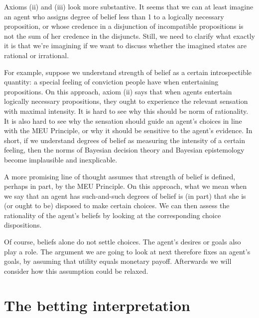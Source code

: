 Axioms (ii) and (iii) look more substantive. It seems that we can at least
imagine an agent who assigns degree of belief less than 1 to a logically
necessary proposition, or whose credence in a disjunction of incompatible
propositions is not the sum of her credence in the disjuncts. Still,
we need to clarify what exactly it is that we're imagining if we want to discuss
whether the imagined states are rational or irrational.

For example, suppose we understand strength of belief as a certain
introspectible quantity: a special feeling of conviction people have when
entertaining propositions. On this approach, axiom (ii) says that when agents
entertain logically necessary propositions, they ought to experience the
relevant sensation with maximal intensity. It is hard to see why this should be
norm of rationality. It is also hard to see why the sensation should guide an
agent's choices in line with the MEU Principle, or why it should be sensitive to
the agent's evidence. In short, if we understand degrees of belief as measuring
the intensity of a certain feeling, then the norms of Bayesian decision theory
and Bayesian epistemology become implausible and inexplicable.


A more promising line of thought assumes that strength of belief is defined,
perhaps in part, by the MEU Principle. On this approach, what we mean when we
say that an agent has such-and-such degrees of belief is (in part) that she is
(or ought to be) disposed to make certain choices. We can then assess the
rationality of the agent's beliefs by looking at the corresponding choice
dispositions.

Of course, beliefs alone do not settle choices. The agent's desires or goals
also play a role. The argument we are going to look at next therefore fixes an
agent's goals, by assuming that utility equals monetary payoff. Afterwards we
will consider how this assumption could be relaxed.


\section{The betting interpretation}

